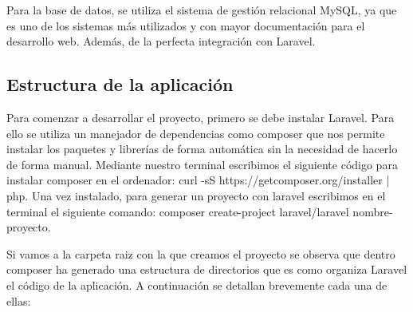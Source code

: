 \vspace{5 mm}

Para la base de datos, se utiliza el sistema de gestión relacional MySQL, ya que es uno de los sistemas más utilizados y con mayor documentación para el desarrollo web. Además, de la perfecta integración con Laravel.

\subsection{Estructura de la aplicación}

Para comenzar a desarrollar el proyecto, primero se debe instalar Laravel. Para ello se utiliza un manejador de dependencias como composer que nos permite instalar los paquetes y librerías de forma automática sin la necesidad de hacerlo de forma manual. Mediante nuestro terminal escribimos el siguiente código para instalar composer en el ordenador: curl -sS https://getcomposer.org/installer | php. Una vez instalado, para generar un proyecto con laravel escribimos en el terminal el siguiente comando: composer create-project laravel/laravel nombre-proyecto.

\vspace{5 mm}

Si vamos a la carpeta raiz con la que creamos el proyecto se observa que dentro composer ha generado una estructura de directorios que es como organiza Laravel el código de la aplicación. A continuación se detallan brevemente cada una de ellas:

